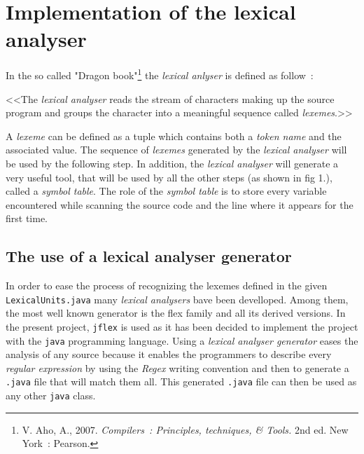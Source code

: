 \documentclass[a4paper,11pt]{article}
\begin{document}
\section{Implementation of the lexical analyser}

  In the so called "Dragon book"\footnote{V. Aho, A., 2007. \textit{Compilers~: Principles, techniques, \& Tools.} 2nd ed. New York~: Pearson.} the \textit{lexical anlyser} is defined as follow~:
  \begin{center}
    <<The \textit{lexical analyser} reads the stream of characters making up the source program and groups the character into a meaningful sequence called \textit{lexemes}.>>
  \end{center}
  A \textit{lexeme} can be defined as a tuple which contains both a \textit{token name} and the associated value. The sequence of \textit{lexemes} generated by the \textit{lexical analyser} will be used by the following step. In addition, the \textit{lexical analyser} will generate a very useful tool, that will be used by all the other steps (as shown in fig 1.), called a \textit{symbol table}. The role of the \textit{symbol table} is to store every variable encountered while scanning the source code and the line where it appears for the first time.\\
  
  \subsection{The use of a lexical analyser generator}
    In order to ease the process of recognizing the lexemes defined in the given \verb|LexicalUnits.java| many \textit{lexical analysers} bave been develloped. Among them, the most well known generator is the flex family and all its derived versions. In the present project, \verb|jflex| is used as it has been decided to implement the project with the \verb|java| programming language. Using a \textit{lexical analyser generator} eases the analysis of any source because it enables the programmers to describe every \textit{regular expression} by using the \textit{Regex} writing convention and then to generate a \verb|.java| file that will match them all. This generated \verb|.java| file can then be used as any other \verb|java| class. 
  
\end{document}
